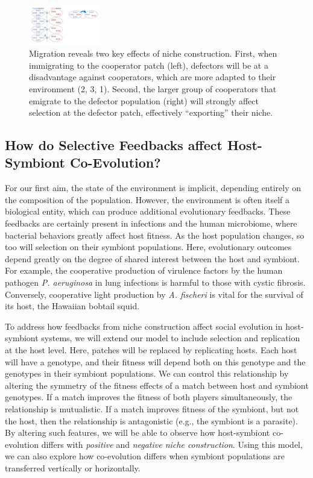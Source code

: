 \documentclass[10pt,]{article}
\begin{document}
\begin{figure}
    \vspace{18.5em}
    \includegraphics[width=0.279\textwidth]{figures/diagram2}
\caption{Migration reveals two key effects of niche construction. First,
when immigrating to the cooperator patch (left), defectors will be at a
disadvantage against cooperators, which are more adapted to their
environment (2, 3, 1). Second, the larger group of
cooperators that emigrate to the defector population (right) will
strongly affect selection at the defector patch, effectively
``exporting'' their niche.}
    \label{fig2}
    \vspace{-15em}
\end{figure} 


\subsection{How do Selective Feedbacks affect Host-Symbiont
Co-Evolution?}\label{how-do-selective-feedbacks-affect-host-symbiont-co-evolution}

For our first aim, the state of the environment is implicit, depending
entirely on the composition of the population. However, the environment
is often itself a biological entity, which can produce additional
evolutionary feedbacks. These feedbacks are certainly present in
infections and the human microbiome, where bacterial behaviors greatly
affect host fitness. As the host population changes, so too will
selection on their symbiont populations. Here, evolutionary outcomes
depend greatly on the degree of shared interest between the host and
symbiont. For example, the cooperative production of virulence factors
by the human pathogen \emph{P. aeruginosa} in lung infections is harmful
to those with cystic fibrosis. Conversely, cooperative light production
by \emph{A. fischeri} is vital for the survival of its host, the
Hawaiian bobtail squid.

To address how feedbacks from niche construction affect social evolution in
host-symbiont systems, we will extend our model to include selection and
replication at the host level. Here, patches will be replaced by replicating
hosts. Each host will have a genotype, and their fitness will depend both on
this genotype and the genotypes in their symbiont populations. We can control
this relationship by altering the symmetry of the fitness effects of a match
between host and symbiont genotypes. If a match improves the fitness of both
players simultaneously, the relationship is mutualistic. If a match improves
fitness of the symbiont, but not the host, then the relationship is
antagonistic (e.g., the symbiont is a parasite). By altering such features, we
will be able to observe how host-symbiont co-evolution differs with
\emph{positive} and \emph{negative niche construction}. Using this model, we
can also explore how co-evolution differs when symbiont populations are
transferred vertically or horizontally.
\end{document}
